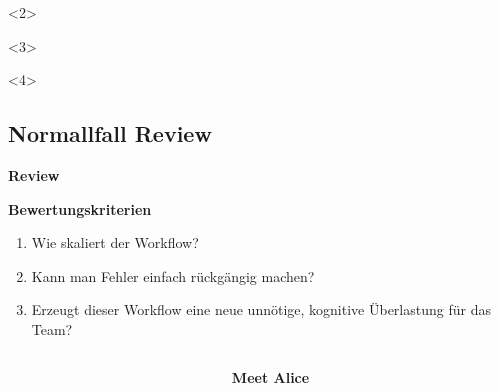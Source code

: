 \begin{frame}[c, fragile]
\begin{center}
\begin{onlyenv}
            \vspace{1em}

            \begin{onlyenv}<2>
            \end{onlyenv}
            \begin{onlyenv}<3>
            \end{onlyenv}
            \begin{onlyenv}<4>
            \end{onlyenv}
            \vspace{-1em}
        \end{onlyenv}
    \end{center}
\end{frame}

\subsection{Normallfall Review}\label{subsec:normallfall-review}
\begin{frame}[c]
    \slidehead
    \centering
    \Large
    \textbf{Review}
\end{frame}

\begin{frame}[c]
    \slidehead
    \large
    \textbf{Bewertungskriterien}
    \normalsize
    \begin{enumerate}
        \item<2-> Wie skaliert der Workflow? 
        \item<4-> Kann man Fehler einfach rückgängig machen? 
        \item<6-> Erzeugt dieser Workflow eine neue unnötige, kognitive Überlastung für das Team? 
    \end{enumerate}
\end{frame}

\begin{frame}[c]
    \begin{columns}[c]
        \begin{column}{.5\textwidth}
            \centering
            
        \end{column}
        \begin{column}{.5\textwidth}
            \Large
            \textcolor{TUDa-10a}{\textbf{Meet Alice}}
        \end{column}
    \end{columns}
\end{frame}

